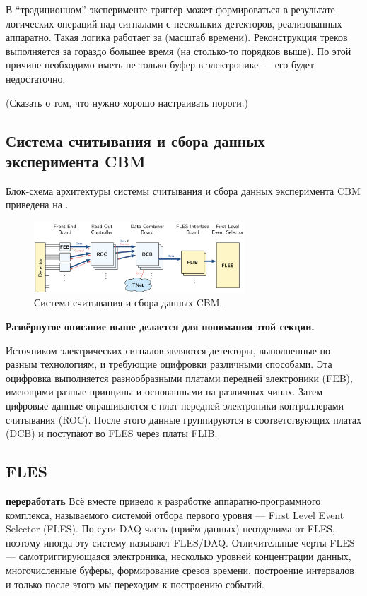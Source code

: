 В ``традиционном'' эксперименте триггер может формироваться в результате логических операций над сигналами с нескольких детекторов, реализованных аппаратно. Такая логика работает за (\todo масштаб времени). Реконструкция треков выполняется за гораздо большее время (\todo на столько-то порядков выше). По этой причине необходимо иметь не только буфер в электронике --- его будет недостаточно. 

(Сказать о том, что нужно хорошо настраивать пороги.)

\subsection{Система считывания и сбора данных эксперимента CBM}\label{CBMreadout}

Блок-схема архитектуры системы считывания и сбора данных эксперимента CBM приведена на .

\begin{figure}[H]
\centering
\includegraphics[width=0.7\textwidth]{pictures/CBMreadout.png}
\caption{Система считывания и сбора данных CBM.}
\label{fig:CBMreadout}
\end{figure}

\textbf{Развёрнутое описание выше делается для понимания этой секции.}

Источником электрических сигналов являются детекторы, выполненные по разным технологиям, и требующие оцифровки различными способами. Эта оцифровка выполняется разнообразными платами передней электроники (FEB), имеющими разные принципы и основанными на различных чипах. Затем цифровые данные опрашиваются с плат передней электроники контроллерами считывания (ROC). После этого данные группируются в соответствующих платах (DCB) и поступают во FLES через платы FLIB.

\subsection{FLES}\label{sec:secFLES}

\textbf{переработать}
Всё вместе привело к разработке аппаратно-программного комплекса, называемого системой отбора первого уровня --- First Level Event Selector (FLES). По сути DAQ-часть (приём данных) неотделима от FLES, поэтому иногда эту систему называют FLES/DAQ.
Отличительные черты FLES --- самотриггирующаяся электроника, несколько уровней концентрации данных, многочисленные буферы, формирование срезов времени, построение интервалов и только после этого мы переходим к построению событий.


